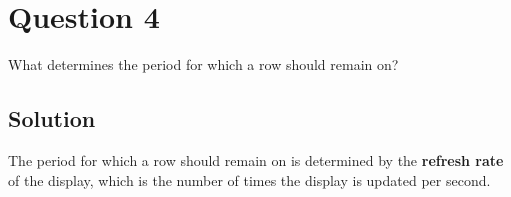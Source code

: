 \section*{Question 4}

What determines the period for which a row should remain on?

\subsection*{Solution}

The period for which a row should remain on is determined by the \textbf{refresh rate} of the display, which is the number of times the display is updated per second.
